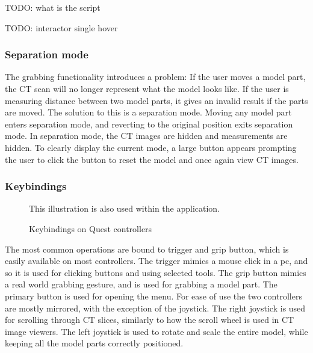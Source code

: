 \documentclass[a4paper]{report}
\begin{document}
TODO: what is the script

TODO: interactor single hover


\subsubsection{Separation mode}
The grabbing functionality introduces a problem: If the user moves a model part, the CT scan will no longer represent what the model looks like. If the user is measuring distance between two model parts, it gives an invalid result if the parts are moved. 
The solution to this is a separation mode. Moving any model part enters separation mode, and reverting to the original position exits separation mode. In separation mode, the CT images are hidden and measurements are hidden. To clearly display the current mode, a large button appears prompting the user to click the button to reset the model and once again view CT images.


\subsubsection{Keybindings}

\begin{figure}[h!]
    \centering
	\hfill
  \caption{Keybindings on Quest controllers}
  \small
  This illustration is also used within the application.
\end{figure}

The most common operations are bound to trigger and grip button, which is easily available on most controllers. The trigger mimics a mouse click in a pc, and so it is used for clicking buttons and using selected tools. The grip button mimics a real world grabbing gesture, and is used for grabbing a model part.
The primary button is used for opening the menu.
For ease of use the two controllers are mostly mirrored, with the exception of the joystick. The right joystick is used for scrolling through CT slices, similarly to how the scroll wheel is used in CT image viewers. The left joystick is used to rotate and scale the entire model, while keeping all the model parts correctly positioned.
\end{document}
